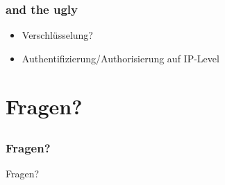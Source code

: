 \documentclass{beamer}
\begin{document}
\begin{frame}
	\frametitle{and the ugly}
	
	\begin{itemize}
		\item Verschl\"usselung?
		\item Authentifizierung/Authorisierung auf IP-Level
	\end{itemize}
	
\end{frame}

\section{Fragen?}
\subsection*{}

\begin{frame}
	
	\frametitle{Fragen?}
	\begin{center}
		\large Fragen?
	\end{center}
\end{frame}
\end{document}

